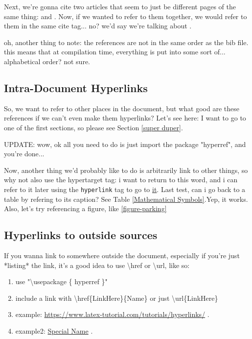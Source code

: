 Next, we're gonna cite two articles that seem to just be different pages of the same thing: \cite{m85} and \cite{m99}. Now, if we wanted to refer to them together, we would refer to them in the same cite tag... no? we'd say we're talking about \cite{m85,m99}.

oh, another thing to note: the references are not in the same order as the bib file. this means that at compilation time, everything is put into some sort of... alphabetical order? not sure.

\subsection{Intra-Document Hyperlinks}
So, we want to refer to other places in the document, but what good are these references if we can't even make them hyperlinks? Let's see here: I want to go to one of the first sections, so please see Section \ref{super duper}. 

UPDATE: wow, ok all you need to do is just import the package "hyperref", and you're done...

Now, another thing we'd probably like to do is arbitrarily link to other things, so why not also use the hypertarget tag: 
i want to return to this \hypertarget{special_word}{word}, and i can refer to it later using the \texttt{hyperlink} tag to go to \hyperlink{special_word}{it}. 
Last test, can i go back to a table by refering to its caption? See Table \ref{Mathematical Symbols}.Yep, it works. Also, let's try referencing a figure, like \ref{figure-parking}


\subsection{Hyperlinks to outside sources}
If you wanna link to somewhere outside the document, especially if you're just *listing* the link, it's a good idea to use \textbackslash href or \textbackslash url, like so: 

\begin{enumerate} \itemsep=-0.5em
\item use "\textbackslash usepackage \{ hyperref \}"
\item include a link with \textbackslash href\{LinkHere\}\{Name\} or just \textbackslash url\{LinkHere\}
\item example: \url{https://www.latex-tutorial.com/tutorials/hyperlinks/} .
\item example2: \href{https://www.latex-tutorial.com/tutorials/hyperlinks/}{Special Name} .

\end{enumerate}


